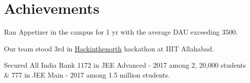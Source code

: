 \documentclass[letterpaper]{deedy-resume} %
\begin{document}
\begin{minipage}[t]{0.66\textwidth}




\section{Achievements} 
\begin{tightitemize}
\sectionspace %
\item Ran Appetizer in the campus for 1 yr with the average DAU exceeding 3500. 
\item Our team stood 3rd in \href{https://www.hackinthenorth.com/}{Hackinthenorth} hackathon at IIIT Allahabad. 
\item Secured All India Rank 1172 in JEE Advanced - 2017 among 2, 20,000 students \& 777 in JEE Main - 2017 among 1.5 million students.


\end{tightitemize}

\sectionspace %


\end{minipage} %








\end{document}
